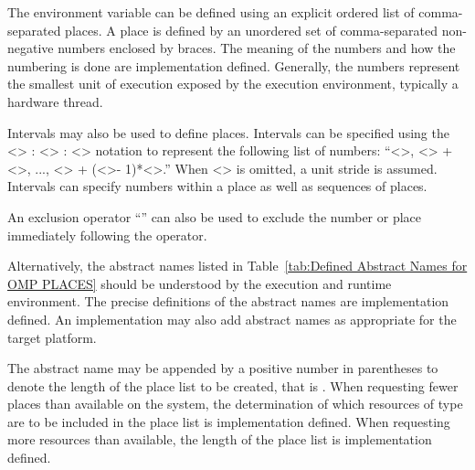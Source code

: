 The  environment variable can be defined using an explicit ordered list of 
comma-separated places. A place is defined by an unordered set of comma-separated 
non-negative numbers enclosed by braces. The meaning of the numbers and how the 
numbering is done are implementation defined. Generally, the numbers represent the 
smallest unit of execution exposed by the execution environment, typically a hardware 
thread.

Intervals may also be used to define places. Intervals can be specified using the 
<> : <> : <> notation to represent the following list of numbers: 
``<>, <> + <>, ..., <> + (<>-
1)*<>.'' When <> is omitted, a unit stride is assumed. Intervals can specify 
numbers within a place as well as sequences of places.

An exclusion operator ``\code{!}'' can also be used to exclude the number or place immediately 
following the operator.

Alternatively, the abstract names listed in
Table~\ref{tab:Defined Abstract Names for OMP PLACES} should be understood
by the execution and runtime environment. The precise definitions of the
abstract names are implementation defined. An implementation may also add
abstract names as appropriate for the target platform.

The abstract name may be appended by a positive number in parentheses to denote the 
length of the place list to be created, that is . When 
requesting fewer places than available on the system, the determination of which 
resources of type  are to be included in the place list is implementation 
defined. When requesting more resources than available, the length of the place list is 
implementation defined.


